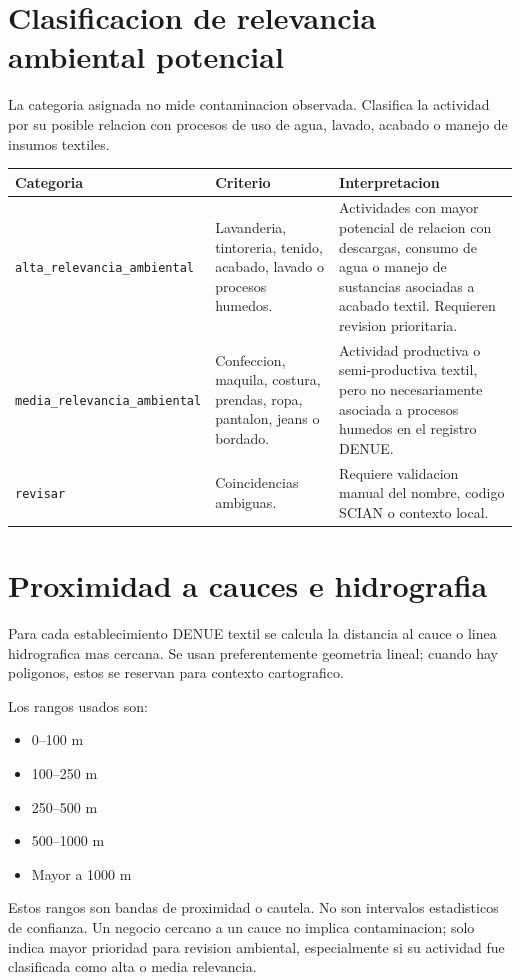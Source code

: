 \documentclass[11pt,letterpaper]{article}
\begin{document}
\section{Clasificacion de relevancia ambiental potencial}

La categoria asignada no mide contaminacion observada. Clasifica la actividad por su posible relacion con procesos de uso de agua, lavado, acabado o manejo de insumos textiles.

\begin{longtable}{p{4cm}p{5cm}p{6cm}}
\toprule
Categoria & Criterio & Interpretacion \\
\midrule
\texttt{alta\_relevancia\_ambiental} & Lavanderia, tintoreria, tenido, acabado, lavado o procesos humedos. & Actividades con mayor potencial de relacion con descargas, consumo de agua o manejo de sustancias asociadas a acabado textil. Requieren revision prioritaria. \\
\texttt{media\_relevancia\_ambiental} & Confeccion, maquila, costura, prendas, ropa, pantalon, jeans o bordado. & Actividad productiva o semi-productiva textil, pero no necesariamente asociada a procesos humedos en el registro DENUE. \\
\texttt{revisar} & Coincidencias ambiguas. & Requiere validacion manual del nombre, codigo SCIAN o contexto local. \\
\bottomrule
\end{longtable}

\section{Proximidad a cauces e hidrografia}

Para cada establecimiento DENUE textil se calcula la distancia al cauce o linea hidrografica mas cercana. Se usan preferentemente geometria lineal; cuando hay poligonos, estos se reservan para contexto cartografico.

Los rangos usados son:

\begin{itemize}
  \item 0--100 m
  \item 100--250 m
  \item 250--500 m
  \item 500--1000 m
  \item Mayor a 1000 m
\end{itemize}

Estos rangos son bandas de proximidad o cautela. No son intervalos estadisticos de confianza. Un negocio cercano a un cauce no implica contaminacion; solo indica mayor prioridad para revision ambiental, especialmente si su actividad fue clasificada como alta o media relevancia.
\end{document}
